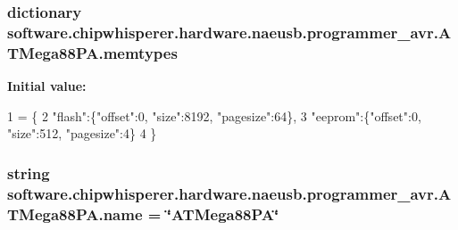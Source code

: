 \subsubsection[{memtypes}]{\setlength{\rightskip}{0pt plus 5cm}dictionary software.\+chipwhisperer.\+hardware.\+naeusb.\+programmer\+\_\+avr.\+A\+T\+Mega88\+P\+A.\+memtypes\hspace{0.3cm}{\ttfamily [static]}}\label{classsoftware_1_1chipwhisperer_1_1hardware_1_1naeusb_1_1programmer__avr_1_1ATMega88PA_a361a12da79ec952db38249b8f058ede8}
{\bfseries Initial value\+:}
\begin{DoxyCode}
1 = \{
2        \textcolor{stringliteral}{"flash"}:\{\textcolor{stringliteral}{"offset"}:0, \textcolor{stringliteral}{"size"}:8192, \textcolor{stringliteral}{"pagesize"}:64\},
3        \textcolor{stringliteral}{"eeprom"}:\{\textcolor{stringliteral}{"offset"}:0, \textcolor{stringliteral}{"size"}:512, \textcolor{stringliteral}{"pagesize"}:4\}
4      \}
\end{DoxyCode}
\hypertarget{classsoftware_1_1chipwhisperer_1_1hardware_1_1naeusb_1_1programmer__avr_1_1ATMega88PA_ab24a0e8314553eff75a747f4d671b766}{}
\subsubsection[{name}]{\setlength{\rightskip}{0pt plus 5cm}string software.\+chipwhisperer.\+hardware.\+naeusb.\+programmer\+\_\+avr.\+A\+T\+Mega88\+P\+A.\+name = \char`\"{}A\+T\+Mega88\+P\+A\char`\"{}\hspace{0.3cm}{\ttfamily [static]}}\label{classsoftware_1_1chipwhisperer_1_1hardware_1_1naeusb_1_1programmer__avr_1_1ATMega88PA_ab24a0e8314553eff75a747f4d671b766}
\hypertarget{classsoftware_1_1chipwhisperer_1_1hardware_1_1naeusb_1_1programmer__avr_1_1ATMega88PA_a0e3412ed434488062014bba19ef137bc}{}
